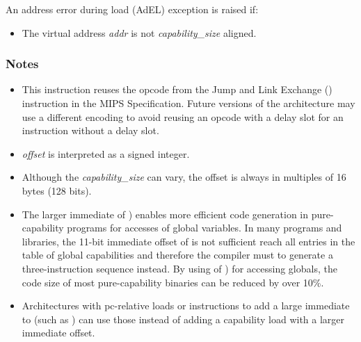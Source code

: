 An address error during load (AdEL) exception is raised if:

\begin{itemize}
\item
The virtual address \emph{addr} is not \emph{capability\_size} aligned.
\end{itemize}

\subsubsection*{Notes}

\begin{itemize}
\item
This instruction reuses the opcode from the Jump and Link Exchange
() instruction in the MIPS Specification.
Future versions of the architecture may use a different encoding
to avoid reusing an opcode with a delay slot for an instruction without a delay slot.
\item
\emph{offset} is interpreted as a signed integer.
\item
Although the \emph{capability\_size} can vary, the offset is always in
multiples of 16 bytes (128 bits).
\item
The larger immediate of ) enables more efficient code generation
in pure-capability programs for accesses of global variables.
In many programs and libraries, the 11-bit immediate offset of 
is not sufficient reach all entries in the table of global capabilities and
therefore the compiler must to generate a three-instruction sequence instead.
By using of ) for accessing globals, the code size of most
pure-capability binaries can be reduced by over 10\%.

\item
Architectures with pc-relative loads or instructions to add a large immediate to \PCC{}
(such as ) can use those instead of adding a capability
load with a larger immediate offset.

\end{itemize}
